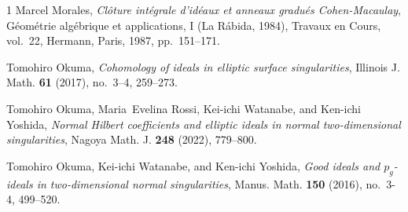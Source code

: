 \documentclass[12pt]{amsart}
\theoremstyle{definition}
\theoremstyle{remark}
\numberwithin{equation}{section}
\renewcommand{\:}{\colon}
\begin{document}
\begin{thebibliography}{1}
Marcel Morales, \emph{Cl\^oture int\'egrale d'id\'eaux et anneaux gradu\'es
  {C}ohen-{M}acaulay}, G\'eom\'etrie alg\'ebrique et applications, {I} ({L}a
  {R}\'abida, 1984), Travaux en Cours, vol.~22, Hermann, Paris, 1987,
  pp.~151--171. 







Tomohiro Okuma, 
 \emph{Cohomology of ideals in elliptic surface singularities}, 
 Illinois J. Math. \textbf{61} (2017), no.~3--4, 259--273.

 

Tomohiro Okuma, Maria~Evelina Rossi, Kei-ichi Watanabe, and Ken-ichi Yoshida,
  \emph{Normal {Hilbert} coefficients and elliptic ideals in normal
  two-dimensional singularities}, Nagoya Math. J. \textbf{248} (2022),
  779--800.

Tomohiro Okuma, Kei-ichi Watanabe, and Ken-ichi Yoshida, \emph{Good ideals and
  {$p_g$}-ideals in two-dimensional normal singularities}, Manus. Math.
  \textbf{150} (2016), no.~3-4, 499--520.

%



\end{thebibliography}
\end{document}
